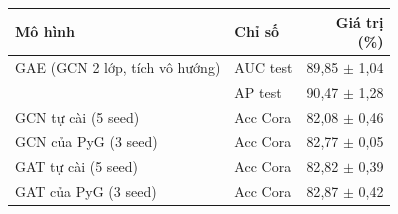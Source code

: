 \begin{tabular}{llr}
\toprule
Mô hình & Chỉ số & \makecell[r]{Giá trị\\(\%)} \\
\midrule
GAE (GCN 2 lớp, tích vô hướng) & AUC test & 89{,}85 $\pm$ 1{,}04 \\
 & AP test & 90{,}47 $\pm$ 1{,}28 \\
\midrule
GCN tự cài (5 seed) & Acc Cora & 82{,}08 $\pm$ 0{,}46 \\
GCN của PyG (3 seed) & Acc Cora & 82{,}77 $\pm$ 0{,}05 \\
GAT tự cài (5 seed) & Acc Cora & 82{,}82 $\pm$ 0{,}39 \\
GAT của PyG (3 seed) & Acc Cora & 82{,}87 $\pm$ 0{,}42 \\
\bottomrule
\end{tabular}

